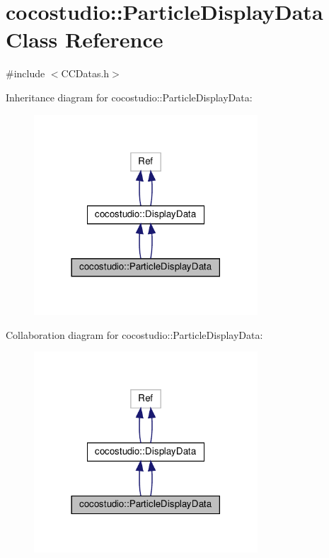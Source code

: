 \hypertarget{classcocostudio_1_1ParticleDisplayData}{}\section{cocostudio\+:\+:Particle\+Display\+Data Class Reference}
\label{classcocostudio_1_1ParticleDisplayData}


{\ttfamily \#include $<$C\+C\+Datas.\+h$>$}



Inheritance diagram for cocostudio\+:\+:Particle\+Display\+Data\+:
\nopagebreak
\begin{figure}[H]
\begin{center}
\leavevmode
\includegraphics[width=237pt]{classcocostudio_1_1ParticleDisplayData__inherit__graph}
\end{center}
\end{figure}


Collaboration diagram for cocostudio\+:\+:Particle\+Display\+Data\+:
\nopagebreak
\begin{figure}[H]
\begin{center}
\leavevmode
\includegraphics[width=237pt]{classcocostudio_1_1ParticleDisplayData__coll__graph}
\end{center}
\end{figure}
